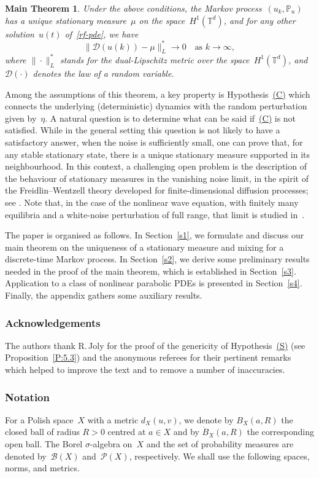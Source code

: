 \documentclass[JEP,XML,SOM,Unicode,ThmDefs]{cedram}
\let\mathcal\mathscr
\theoremstyle{plain}
\newtheorem*{mt}{Main Theorem}
\numberwithin{equation}{section}
\newcommand{\IP}{{\mathbb P}}
\newcommand{\T}{{\mathbb T}}
\newcommand{\BB}{{\mathcal B}}
\newcommand{\DD}{{\mathcal D}}
\newcommand{\PP}{{\mathcal P}}
\begin{document}
\begin{mt}
Under the above conditions, the Markov process~$(u_k,\IP_u)$ has a unique stationary measure~$\mu$ on the space~$H^1(\T^d)$, and for any other solution~$u(t)$ of~\eqref{rf-pde}, we have
\[
\|\DD(u(k))-\mu\|_L^*\to0\quad\text{as $k\to\infty$},
\]
where $\|\cdot\|_L^*$ stands for the dual-Lipschitz metric over the space~$H^1(\T^d)$, and~$\DD(\cdot)$ denotes the law of a random variable.
\end{mt}

Among the assumptions of this theorem, a key property is Hypothesis~\hyperlink{C}{(C)} which connects the underlying (deterministic) dynamics with the random perturbation given by~$\eta$. A natural question is to determine what can be said if~\hyperlink{C}{(C)} is not satisfied. While in the general setting this question is not likely to have a satisfactory answer, when the noise is sufficiently small, one can prove that, for any stable stationary state, there is a unique stationary measure supported in its neighbourhood. In this context, a challenging open problem is the description of the behaviour of stationary measures in the vanishing noise limit, in the spirit of the Freidlin--Wentzell theory developed for finite-dimensional diffusion processes; see \cite[Chap.\,6]{FW1984}. Note that, in the case of the nonlinear wave equation, with finitely many equilibria and a white-noise perturbation of full range, that limit is studied in~\cite{martirosyan-2017}.

The paper is organised as follows. In Section~\ref{s1}, we formulate and discuss our main theorem on the uniqueness of a stationary measure and mixing for a discrete-time Markov process. In Section~\ref{s2}, we derive some preliminary results needed in the proof of the main theorem, which is established in Section~\ref{s3}. Application to a class of nonlinear parabolic PDEs is presented in Section~\ref{s4}. Finally, the appendix gathers some auxiliary results.

\subsubsection*{Acknowledgements}
The authors thank R.\,Joly for the proof of the genericity of Hypothesis~\hyperlink{S}{\rm(S)} (see Proposition~\ref{P:5.3}) and the anonymous referees for their pertinent remarks which helped to improve the text and to remove a number of inaccuracies.

\subsubsection*{Notation}
For a Polish space~$X$ with a metric $d_X(u,v)$, we denote by $B_X(a,R)$ the closed ball of radius $R > 0$ centred at $a\in X$ and by $\dot B_X(a,R)$ the corresponding open ball. The Borel $\sigma$-algebra on~$X$ and the set of probability measures are denoted by~$\BB(X)$ and~$\PP(X)$, respectively. We shall use the following spaces, norms, and metrics.
\end{document}
